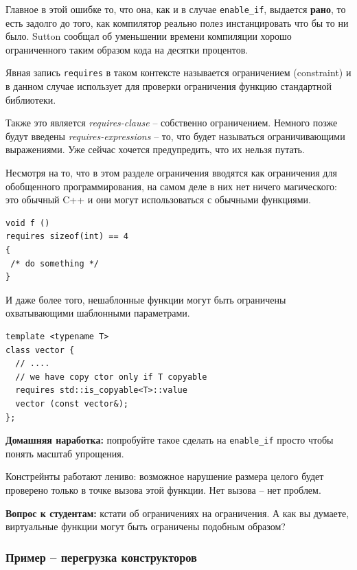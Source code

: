 \documentclass[a4paper,12pt,oneside]{article}
\newif\ifanswers
\begin{document}
Главное в этой ошибке то, что она, как и в случае \lstinline!enable_if!, выдается \textbf{рано}, то есть задолго до того, как компилятор реально полез инстанцировать что бы то ни было. Sutton сообщал об уменьшении времени компиляции хорошо ограниченного таким образом кода на десятки процентов.

Явная запись \lstinline!requires! в таком контексте называется ограничением (constraint) и в данном случае использует для проверки ограничения функцию стандартной библиотеки.

Также это является \textit{requires-clause} -- собственно ограничением. Немного позже будут введены \textit{requires-expressions} -- то, что будет называться ограничивающими выражениями. Уже сейчас хочется предупредить, что их нельзя путать.

Несмотря на то, что в этом разделе ограничения вводятся как ограничения для обобщенного программирования, на самом деле в них нет ничего магического: это обычный C++ и они могут использоваться с обычными функциями.

\begin{lstlisting}
void f ()
requires sizeof(int) == 4
{
 /* do something */
}
\end{lstlisting}

И даже более того, нешаблонные функции могут быть ограничены охватывающими шаблонными параметрами.

\begin{lstlisting}
template <typename T>
class vector {
  // ....
  // we have copy ctor only if T copyable
  requires std::is_copyable<T>::value
  vector (const vector&);
};
\end{lstlisting}

\textbf{Домашняя наработка:} попробуйте такое сделать на \lstinline!enable_if! просто чтобы понять масштаб упрощения.

Констрейнты работают лениво: возможное нарушение размера целого будет проверено только в точке вызова этой функции. Нет вызова -- нет проблем.

\textbf{Вопрос к студентам:} кстати об ограничениях на ограничения. А как вы думаете, виртуальные функции могут быть ограничены подобным образом?

\ifanswers
Правильный ответ: конечно не могут (примерно по тем же причинам, по каким они не могут быть шаблонными). В таблице виртуальных функций просто нет места для этого признака, а связывать его со статическим типом чревато проблемами.
\fi

\subsubsection{Пример -- перегрузка конструкторов}
\end{document}
